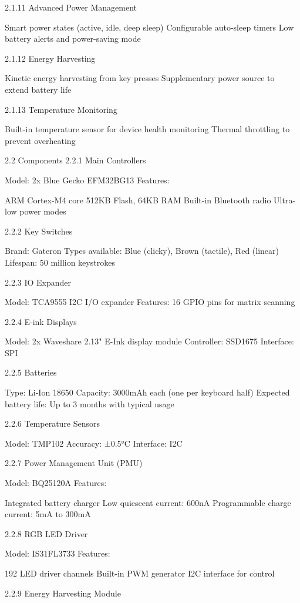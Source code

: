 \documentclass[a4paper,11pt]{article}%
\begin{document}
2.1.11 Advanced Power Management

Smart power states (active, idle, deep sleep)
Configurable auto-sleep timers
Low battery alerts and power-saving mode

2.1.12 Energy Harvesting

Kinetic energy harvesting from key presses
Supplementary power source to extend battery life

2.1.13 Temperature Monitoring

Built-in temperature sensor for device health monitoring
Thermal throttling to prevent overheating

2.2 Components
2.2.1 Main Controllers

Model: 2x Blue Gecko EFM32BG13
Features:

ARM Cortex-M4 core
512KB Flash, 64KB RAM
Built-in Bluetooth radio
Ultra-low power modes



2.2.2 Key Switches

Brand: Gateron
Types available: Blue (clicky), Brown (tactile), Red (linear)
Lifespan: 50 million keystrokes

2.2.3 IO Expander

Model: TCA9555 I2C I/O expander
Features: 16 GPIO pins for matrix scanning

2.2.4 E-ink Displays

Model: 2x Waveshare 2.13" E-Ink display module
Controller: SSD1675
Interface: SPI

2.2.5 Batteries

Type: Li-Ion 18650
Capacity: 3000mAh each (one per keyboard half)
Expected battery life: Up to 3 months with typical usage

2.2.6 Temperature Sensors

Model: TMP102
Accuracy: ±0.5°C
Interface: I2C

2.2.7 Power Management Unit (PMU)

Model: BQ25120A
Features:

Integrated battery charger
Low quiescent current: 600nA
Programmable charge current: 5mA to 300mA



2.2.8 RGB LED Driver

Model: IS31FL3733
Features:

192 LED driver channels
Built-in PWM generator
I2C interface for control



2.2.9 Energy Harvesting Module
\end{document}
